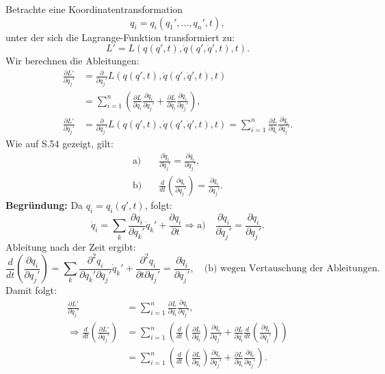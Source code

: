 \documentclass[10pt, letterpaper]{article}
\begin{document}
Betrachte eine Koordinatentransformation
\[
q_i = q_i(q_1', \dotsc, q_n', t),
\]
unter der sich die Lagrange-Funktion transformiert zu:
\[
L' = L(q(q',t), \dot{q}(q', \dot{q}', t), t).
\]
Wir berechnen die Ableitungen:
\begin{align*}
\frac{\partial L'}{\partial q_j'} 
&= \frac{\partial}{\partial q_j'} L(q(q',t), \dot{q}(q', \dot{q}', t), t) \\
&= \sum_{i=1}^n \left( 
    \frac{\partial L}{\partial q_i} \frac{\partial q_i}{\partial q_j'} 
  + \frac{\partial L}{\partial \dot{q}_i} \frac{\partial \dot{q}_i}{\partial q_j'} 
\right), \\[1ex]
\frac{\partial L'}{\partial \dot{q}_j'} 
&= \frac{\partial}{\partial \dot{q}_j'} L(q(q',t), \dot{q}(q', \dot{q}', t), t) 
= \sum_{i=1}^n \frac{\partial L}{\partial \dot{q}_i} \frac{\partial \dot{q}_i}{\partial \dot{q}_j'}.
\end{align*}
Wie auf S.54 gezeigt, gilt:
\begin{align*}
\text{a)}\quad &\frac{\partial \dot{q}_i}{\partial \dot{q}_j'} = \frac{\partial q_i}{\partial q_j'}, \\
\text{b)}\quad &\frac{d}{dt} \left( \frac{\partial q_i}{\partial q_j'} \right) = \frac{\partial \dot{q}_i}{\partial q_j'}.
\end{align*}
\textbf{Begründung:}  
Da \( q_i = q_i(q', t) \), folgt:
\[
\dot{q}_i = \sum_k \frac{\partial q_i}{\partial q_k'} \dot{q}_k' + \frac{\partial q_i}{\partial t}
\Rightarrow \text{a)} \quad \frac{\partial \dot{q}_i}{\partial \dot{q}_j'} = \frac{\partial q_i}{\partial q_j'}.
\]
Ableitung nach der Zeit ergibt:
\[
\frac{d}{dt} \left( \frac{\partial q_i}{\partial q_j'} \right)
= \sum_k \frac{\partial^2 q_i}{\partial q_k' \partial q_j'} \dot{q}_k' + \frac{\partial^2 q_i}{\partial t \partial q_j'}
= \frac{\partial \dot{q}_i}{\partial q_j'}, \quad \text{(b) wegen Vertauschung der Ableitungen}.
\]
Damit folgt:
\begin{align*}
\frac{\partial L'}{\partial \dot{q}_j'} 
&= \sum_{i=1}^n \frac{\partial L}{\partial \dot{q}_i} \frac{\partial q_i}{\partial q_j'}, \\
\Rightarrow \frac{d}{dt} \left( \frac{\partial L'}{\partial \dot{q}_j'} \right)
&= \sum_{i=1}^n \left( 
  \frac{d}{dt} \left( \frac{\partial L}{\partial \dot{q}_i} \right) \frac{\partial q_i}{\partial q_j'} 
+ \frac{\partial L}{\partial \dot{q}_i} \frac{d}{dt} \left( \frac{\partial q_i}{\partial q_j'} \right) 
\right) \\
&= \sum_{i=1}^n \left( 
  \frac{d}{dt} \left( \frac{\partial L}{\partial \dot{q}_i} \right) \frac{\partial q_i}{\partial q_j'} 
+ \frac{\partial L}{\partial \dot{q}_i} \frac{\partial \dot{q}_i}{\partial q_j'}
\right).
\end{align*}
\end{document}
